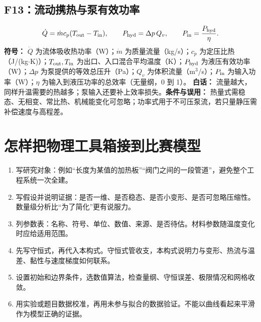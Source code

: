 \subsection{F13：流动携热与泵有效功率}
\begin{equation}
\dot Q=\dot m c_p(T_{\rm out}-T_{\rm in}),\qquad P_{\rm hyd}=\Delta p\,Q_v,\qquad P_{\rm in}=\frac{P_{\rm hyd}}\eta.
\end{equation}
\textbf{符号：} $\dot Q$ 为流体吸收热功率（W）；$\dot m$ 为质量流量（kg/s）；$c_p$ 为定压比热（J/(kg$\cdot$K)）；$T_{\rm out},T_{\rm in}$ 为出口、入口混合平均温度（K）；$P_{\rm hyd}$ 为液压有效功率（W）；$\Delta p$ 为泵提供的等效总压升（Pa）；$Q_v$ 为体积流量（m$^3$/s）；$P_{\rm in}$ 为输入功率（W）；$\eta$ 为输入到液压功率的总效率（无量纲，0 到 1）。
\textbf{白话：} 流量越大，同样升温需要的热越多；泵输入还要补上效率损失。\textbf{条件与误用：} 热量式需稳态、无相变、常比热、机械能变化可忽略；功率式用于不可压泵流，若只量静压需补偿速度与高程差。

\section{怎样把物理工具箱接到比赛模型}
\begin{enumerate}
\item 写研究对象：例如“长度为某值的加热板”“阀门之间的一段管道”，避免整个工程系统一次全建。
\item 写假设并说明证据：是否一维、是否稳态、是否小变形、是否可忽略压缩性。数量级分析比“为了简化”更有说服力。
\item 列参数表：名称、符号、单位、数值、来源、是否待估。材料参数随温度变化时应给适用范围。
\item 先写守恒式，再代入本构式。守恒式管收支，本构式说明力与变形、热流与温差、黏性与速度梯度如何联系。
\item 设置初始和边界条件，选数值算法，检查量纲、守恒误差、极限情况和网格收敛。
\item 用实验或题目数据校准，再用未参与拟合的数据验证。不能以曲线看起来平滑作为模型正确的证据。
\end{enumerate}
